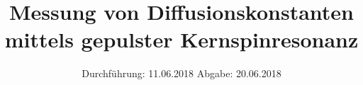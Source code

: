 

\subject{V 49}
\title{Messung von Diffusionskonstanten mittels gepulster
Kernspinresonanz}
\date{
  Durchführung: 11.06.2018
  \hspace{3em}
  Abgabe: 20.06.2018
}



\maketitle
\thispagestyle{empty}
\tableofcontents
\newpage


\clearpage
\newpage

\clearpage
\newpage

\clearpage
\newpage
%

\clearpage
\newpage

\clearpage
\newpage

\printbibliography

\clearpage
\newpage





%
%
%     
%

